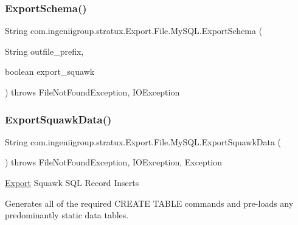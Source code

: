 \subsubsection{\texorpdfstring{Export\+Schema()}{ExportSchema()}\hspace{0.1cm}{\footnotesize\ttfamily [3/3]}}
{\footnotesize\ttfamily String com.\+ingeniigroup.\+stratux.\+Export.\+File.\+My\+S\+Q\+L.\+Export\+Schema (\begin{DoxyParamCaption}\item[{String}]{outfile\+\_\+prefix,  }\item[{boolean}]{export\+\_\+squawk }\end{DoxyParamCaption}) throws File\+Not\+Found\+Exception, I\+O\+Exception}

\mbox{\label{classcom_1_1ingeniigroup_1_1stratux_1_1_export_1_1_file_1_1_my_s_q_l_a7f8f9a06f28b45853a234bf9dc20ea32}} 
\subsubsection{\texorpdfstring{Export\+Squawk\+Data()}{ExportSquawkData()}\hspace{0.1cm}{\footnotesize\ttfamily [1/2]}}
{\footnotesize\ttfamily String com.\+ingeniigroup.\+stratux.\+Export.\+File.\+My\+S\+Q\+L.\+Export\+Squawk\+Data (\begin{DoxyParamCaption}{ }\end{DoxyParamCaption}) throws File\+Not\+Found\+Exception, I\+O\+Exception, Exception}

\hyperlink{namespacecom_1_1ingeniigroup_1_1stratux_1_1_export}{Export} Squawk S\+QL Record Inserts

Generates all of the required C\+R\+E\+A\+TE T\+A\+B\+LE commands and pre-\/loads any predominantly static data tables.


